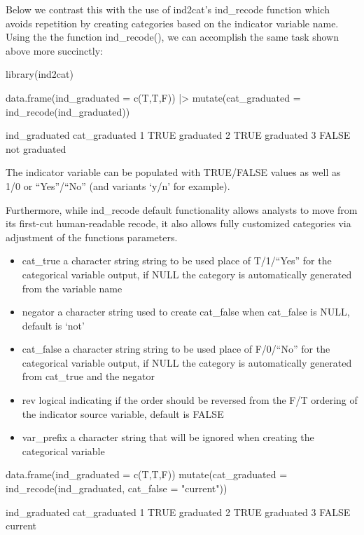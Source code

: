 Below we contrast this with the use of ind2cat's ind\_recode function
which avoids repetition by creating categories based on the indicator
variable name. Using the the function ind\_recode(), we can accomplish
the same task shown above more succinctly:

\begin{Schunk}
\begin{Sinput}
library(ind2cat)

data.frame(ind_graduated = c(T,T,F)) |>
  mutate(cat_graduated  = ind_recode(ind_graduated))
\end{Sinput}
\begin{Soutput}
       ind_graduated cat_graduated
     1          TRUE     graduated
     2          TRUE     graduated
     3         FALSE not graduated
\end{Soutput}
\end{Schunk}

The indicator variable can be populated with TRUE/FALSE values as well
as 1/0 or ``Yes''/``No'' (and variants `y/n' for example).

Furthermore, while ind\_recode default functionality allows analysts to
move from its first-cut human-readable recode, it also allows fully
customized categories via adjustment of the functions parameters.

\begin{itemize}
\item
  cat\_true a character string string to be used place of T/1/``Yes''
  for the categorical variable output, if NULL the category is
  automatically generated from the variable name
\item
  negator a character string used to create cat\_false when cat\_false
  is NULL, default is `not'
\item
  cat\_false a character string string to be used place of F/0/``No''
  for the categorical variable output, if NULL the category is
  automatically generated from cat\_true and the negator
\item
  rev logical indicating if the order should be reversed from the F/T
  ordering of the indicator source variable, default is FALSE
\item
  var\_prefix a character string that will be ignored when creating the
  categorical variable
\end{itemize}

\begin{Schunk}
\begin{Sinput}
data.frame(ind_graduated = c(T,T,F)) %
  mutate(cat_graduated  = ind_recode(ind_graduated, 
                                     cat_false = "current"))
\end{Sinput}
\begin{Soutput}
       ind_graduated cat_graduated
     1          TRUE     graduated
     2          TRUE     graduated
     3         FALSE       current
\end{Soutput}
\end{Schunk}

